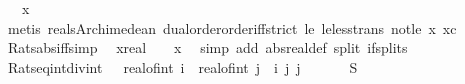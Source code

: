 \begin{isabellebody}
\ \ \ {\isachardoublequoteopen}x\ {\isacharequal}{\kern0pt}\ {}{\isachardoublequoteclose}\isanewline
%
\isadelimproof
\ \ %
\endisadelimproof
%
\isatagproof
{}\isamarkupfalse%
\ {\isacharparenleft}{\kern0pt}metis\ reals{\isacharunderscore}{\kern0pt}Archimedean{}\ dual{\isacharunderscore}{\kern0pt}order{\isachardot}{\kern0pt}order{\isacharunderscore}{\kern0pt}iff{\isacharunderscore}{\kern0pt}strict\ le{}\ le{\isacharunderscore}{\kern0pt}less{\isacharunderscore}{\kern0pt}trans\ not{\isacharunderscore}{\kern0pt}le\ x{}\ xc{\isacharparenright}{\kern0pt}%
\endisatagproof
{\isafoldproof}%
%
\isadelimproof
%
\endisadelimproof
%
\isadelimdocument
%
\endisadelimdocument
%
\isatagdocument
%
\isamarkuptrue%
%
\endisatagdocument
{\isafolddocument}%
%
\isadelimdocument
%
\endisadelimdocument
{}\isamarkupfalse%
\ Rats{\isacharunderscore}{\kern0pt}abs{\isacharunderscore}{\kern0pt}iff{\isacharbrackleft}{\kern0pt}simp{\isacharbrackright}{\kern0pt}{\isacharcolon}{\kern0pt}\isanewline
\ \ {\isachardoublequoteopen}{\isasymbar}{\isacharparenleft}{\kern0pt}x{\isacharcolon}{\kern0pt}{\isacharcolon}{\kern0pt}real{\isacharparenright}{\kern0pt}{\isasymbar}\ {\isasymin}\ {\isasymrat}\ {\isasymlongleftrightarrow}\ x\ {\isasymin}\ {\isasymrat}{\isachardoublequoteclose}\isanewline
%
\isadelimproof
%
\endisadelimproof
%
\isatagproof
{}\isamarkupfalse%
{\isacharparenleft}{\kern0pt}simp\ add{\isacharcolon}{\kern0pt}\ abs{\isacharunderscore}{\kern0pt}real{\isacharunderscore}{\kern0pt}def\ split{\isacharcolon}{\kern0pt}\ if{\isacharunderscore}{\kern0pt}splits{\isacharparenright}{\kern0pt}%
\endisatagproof
{\isafoldproof}%
%
\isadelimproof
\isanewline
%
\endisadelimproof
\isanewline
{}\isamarkupfalse%
\ Rats{\isacharunderscore}{\kern0pt}eq{\isacharunderscore}{\kern0pt}int{\isacharunderscore}{\kern0pt}div{\isacharunderscore}{\kern0pt}int{\isacharcolon}{\kern0pt}\ {\isachardoublequoteopen}{\isasymrat}\ {\isacharequal}{\kern0pt}\ {\isacharbraceleft}{\kern0pt}real{\isacharunderscore}{\kern0pt}of{\isacharunderscore}{\kern0pt}int\ i\ {\isacharslash}{\kern0pt}\ real{\isacharunderscore}{\kern0pt}of{\isacharunderscore}{\kern0pt}int\ j\ {\isacharbar}{\kern0pt}\ i\ j{\isachardot}{\kern0pt}\ j\ {\isasymnoteq}\ {}{\isacharbraceright}{\kern0pt}{\isachardoublequoteclose}\ \ {\isacharparenleft}{\kern0pt}\ {\isachardoublequoteopen}{\isacharunderscore}{\kern0pt}\ {\isacharequal}{\kern0pt}\ {\isacharquery}{\kern0pt}S{\isachardoublequoteclose}{\isacharparenright}{\kern0pt}\isanewline

\end{isabellebody}
